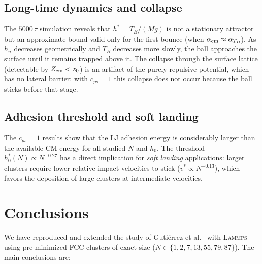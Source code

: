 \documentclass[aps,pre,twocolumn,reprint,superscriptaddress]{revtex4-2}
\newcommand{\lammps}{\textsc{Lammps}}
\begin{document}
\subsection{Long-time dynamics and collapse}
\label{sec:largo_discusion}

The $5000\,\tau$ simulation reveals that $h^*=T_B/(Mg)$ is not a stationary
attractor but an approximate bound valid only for the first bounce (when
$\alpha_{\rm cm}\approx\alpha_{T_B}$). As $h_n$ decreases geometrically and
$T_B$ decreases more slowly, the ball approaches the surface until it
remains trapped above it. The collapse through the surface lattice
(detectable by $Z_{\rm cm}<z_0$) is an artifact of the purely repulsive
potential, which has no lateral barrier: with $c_{ps}=1$ this collapse does
not occur because the ball sticks before that stage.

\subsection{Adhesion threshold and soft landing}
\label{sec:adhesion_discusion}

The $c_{ps}=1$ results show that the LJ adhesion energy is considerably
larger than the available CM energy for all studied $N$ and $h_0$. The
threshold $h_0^*(N)\propto N^{-0.27}$ has a direct implication for
\emph{soft landing} applications: larger clusters require lower relative
impact velocities to stick ($v^*\propto N^{-0.13}$), which favors the
deposition of large clusters at intermediate velocities.

\section{Conclusions}
\label{sec:conclusiones}

We have reproduced and extended the study of Gutiérrez et
al.~\cite{Gutierrez2012} with \lammps{} using pre-minimized FCC clusters of
exact size ($N\in\{1,2,7,13,55,79,87\}$). The main conclusions are:
\end{document}
